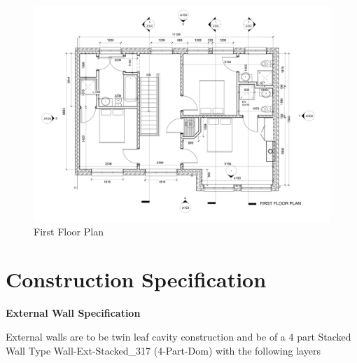 \begin{figure}[th]
	\centering
	\includegraphics[width=1.0\linewidth]{./img/P01FirstFloorLevel.jpg}
	\caption{First Floor Plan}
	\label{fig:p01firstfloorlevel}
\end{figure}


\newpage
\section*{Construction Specification}


\textbf{External Wall Specification} 

External walls are to be twin leaf cavity construction and be of a 4 part Stacked Wall Type
Wall-Ext-Stacked\_317 (4-Part-Dom) with the following layers

